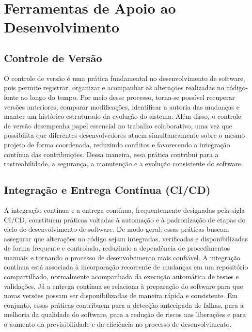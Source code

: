 % 

\section{Ferramentas de Apoio ao Desenvolvimento}

\subsection{Controle de Versão}

O controle de versão é uma prática fundamental no desenvolvimento de software, pois permite registrar, organizar e acompanhar as alterações realizadas no código-fonte ao longo do tempo. Por meio desse processo, torna-se possível recuperar versões anteriores, comparar modificações, identificar a autoria das mudanças e manter um histórico estruturado da evolução do sistema. Além disso, o controle de versão desempenha papel essencial no trabalho colaborativo, uma vez que possibilita que diferentes desenvolvedores atuem simultaneamente sobre o mesmo projeto de forma coordenada, reduzindo conflitos e favorecendo a integração contínua das contribuições. Dessa maneira, essa prática contribui para a rastreabilidade, a segurança, a manutenção e a evolução consistente do software.


\subsection{Integração e Entrega Contínua (CI/CD)}

A integração contínua e a entrega contínua, frequentemente designadas pela sigla CI/CD, constituem práticas voltadas à automação e à padronização de etapas do ciclo de desenvolvimento de software. De modo geral, essas práticas buscam assegurar que alterações no código sejam integradas, verificadas e disponibilizadas de forma frequente e controlada, reduzindo a dependência de procedimentos manuais e tornando o processo de desenvolvimento mais confiável. A integração contínua está associada à incorporação recorrente de mudanças em um repositório compartilhado, normalmente acompanhada da execução automática de testes e validações. Já a entrega contínua se relaciona à preparação do software para que novas versões possam ser disponibilizadas de maneira rápida e consistente. Em conjunto, essas práticas contribuem para a detecção antecipada de falhas, para a melhoria da qualidade do software, para a redução de riscos nas liberações e para o aumento da previsibilidade e da eficiência no processo de desenvolvimento.

